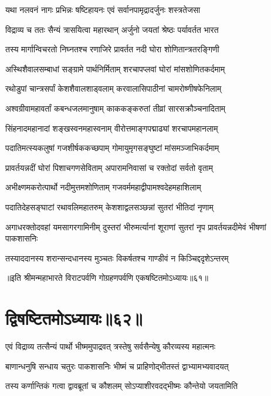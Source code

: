 \twolineshloka
{यथा नलवनं नागः प्रभिन्नः षष्टिहायनः}
{एवं सर्वानपामृद्रादर्जुनः शस्त्रतेजसा}


\twolineshloka
{विद्राव्य च ततः सैन्यं त्रासयित्वा महारथान्}
{अर्जुनो जयतां श्रेष्ठः पर्यावर्तत भारत}


\twolineshloka
{तस्य मार्गान्विचरतो निघ्नतश्च रणाजिरे}
{प्रावर्तत नदी घोरा शोणितान्त्रतरङ्गिणी}


\twolineshloka
{अस्थिशैवालसम्बाधां सङ्ग्रामे पार्थनिर्मिताम्}
{शरचापप्लवां घोरां मांसशोणितकर्दमाम्}


\twolineshloka
{रथोडुपां चान्त्रसर्पां केशशैवालशाड्वलाम्}
{करवालासिपाठीनां चामरोष्णीषफेनिलाम्}


\twolineshloka
{अश्वग्रीवामहावर्तां कबन्धजलमानुषाम्}
{काककङ्करुतां तीव्रां सारसक्रौञ्चनादिताम्}


\twolineshloka
{सिंहनादमहानादां शङ्खस्वनमहास्वनाम्}
{वीरोत्तमाङ्गपद्माढ्यां शरचापमहानलाम्}


\twolineshloka
{पदातिमत्स्यकलुषां गजशीर्षककच्छपाम्}
{गोमायुमृगसङ्घुष्टां मांसमञ्जाभिकर्दमाम्}


\twolineshloka
{प्रावर्तयन्नदीं घोरां पिशाचगणसेविताम्}
{अपारामनिवासां च रक्तोदां सर्वतो वृताम्}


\twolineshloka
{अभीक्ष्णमकरोत्पार्थो नदीमुत्तमशोणिताम्}
{गजवर्ममहाद्वीपामश्वदेहमहाशिलाम्}


\twolineshloka
{पदातिदेहसङ्घाटां रथावलिमहातरुम्}
{केशशाद्वलसञ्छन्नां सुतरां भीतिदां नृणाम्}


\threelineshloka
{अगाधरक्तोदवहां यमसागरगामिनीम्}
{दुस्तरां भीरुमर्त्यानां शूराणां सुतरां नृप}
{प्रावर्तयन्नदीमेवं भीषणां पाकशासनिः}


\twolineshloka
{तस्याददानस्य शरान्सन्दधानस्य मुञ्चतः}
{विकर्षतश्च गाण्डीवं न किञ्चिद्ददृशेऽन्तरम्}

॥इति श्रीमन्महाभारते विराटपर्वणि गोग्रहणपर्वणि एकषष्टितमोऽध्यायः॥६१॥

\chapter{द्विषष्टितमोऽध्यायः॥६२॥}

\twolineshloka
{एवं विद्राव्य तत्सैन्यं पार्थो भीष्ममुपाद्रवत्}
{त्रस्तेषु सर्वसैन्येषु कौरव्यस्य महात्मनः}


\twolineshloka
{बाणान्धनुषि सन्धाय चतुरः पाकशासनिः}
{भीष्मं च प्राहिणोद्भीतस्तं द्वाभ्यामभ्यवादयत्}


\twolineshloka
{तस्य कर्णान्तिकं गत्वा द्वावब्रूतां च कौशलम्}
{सोऽप्याशीरवदद्भीष्मः कौन्तेयो जयतामिति}


